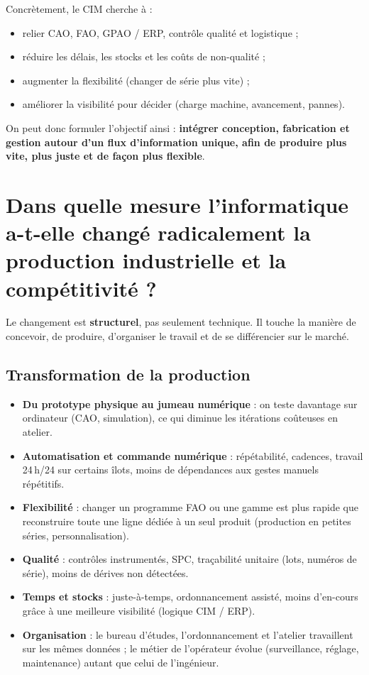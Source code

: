 \documentclass[12pt,a4paper]{article}
\begin{document}
Concrètement, le CIM cherche à :

\begin{itemize}
  \item relier CAO, FAO, GPAO / ERP, contrôle qualité et logistique ;
  \item réduire les délais, les stocks et les coûts de non-qualité ;
  \item augmenter la flexibilité (changer de série plus vite) ;
  \item améliorer la visibilité pour décider (charge machine, avancement, pannes).
\end{itemize}

On peut donc formuler l'objectif ainsi : \textbf{intégrer conception, fabrication et gestion autour d'un flux d'information unique, afin de produire plus vite, plus juste et de façon plus flexible}.

\section{Dans quelle mesure l'informatique a-t-elle changé radicalement la production industrielle et la compétitivité ?}

Le changement est \textbf{structurel}, pas seulement technique. Il touche la manière de concevoir, de produire, d'organiser le travail et de se différencier sur le marché.

\subsection{Transformation de la production}

\begin{itemize}
  \item \textbf{Du prototype physique au jumeau numérique} : on teste davantage sur ordinateur (CAO, simulation), ce qui diminue les itérations coûteuses en atelier.
  \item \textbf{Automatisation et commande numérique} : répétabilité, cadences, travail 24\,h/24 sur certains îlots, moins de dépendances aux gestes manuels répétitifs.
  \item \textbf{Flexibilité} : changer un programme FAO ou une gamme est plus rapide que reconstruire toute une ligne dédiée à un seul produit (production en petites séries, personnalisation).
  \item \textbf{Qualité} : contrôles instrumentés, SPC, traçabilité unitaire (lots, numéros de série), moins de dérives non détectées.
  \item \textbf{Temps et stocks} : juste-à-temps, ordonnancement assisté, moins d'en-cours grâce à une meilleure visibilité (logique CIM / ERP).
  \item \textbf{Organisation} : le bureau d'études, l'ordonnancement et l'atelier travaillent sur les mêmes données ; le métier de l'opérateur évolue (surveillance, réglage, maintenance) autant que celui de l'ingénieur.
\end{itemize}
\end{document}
